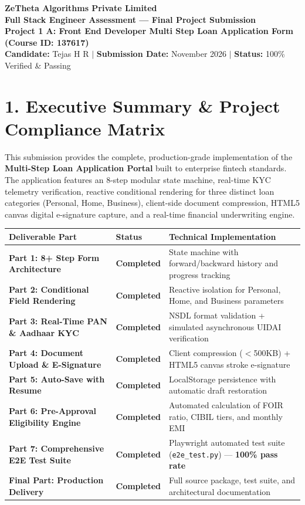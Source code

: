 \documentclass[11pt,a4paper]{article}
\begin{document}
\begin{center}
    {\LARGE \textbf{\color{primary}ZeTheta Algorithms Private Limited}}\\[4pt]
    {\large \textbf{Full Stack Engineer Assessment — Final Project Submission}}\\[2pt]
    \textbf{Project 1 A: Front End Developer Multi Step Loan Application Form (Course ID: 137617)}\\[3pt]
    \textbf{Candidate:} Tejas H R \quad $|$ \quad \textbf{Submission Date:} November 2026 \quad $|$ \quad \textbf{Status:} 100\% Verified \& Passing
\end{center}

\vspace{6pt}

\section{1. Executive Summary \& Project Compliance Matrix}
This submission provides the complete, production-grade implementation of the \textbf{Multi-Step Loan Application Portal} built to enterprise fintech standards. The application features an 8-step modular state machine, real-time KYC telemetry verification, reactive conditional rendering for three distinct loan categories (Personal, Home, Business), client-side document compression, HTML5 canvas digital e-signature capture, and a real-time financial underwriting engine.

\begin{table}[h]
\centering
\scriptsize
\begin{tabular}{@{}llp{8cm}@{}}
\toprule
\textbf{Deliverable Part} & \textbf{Status} & \textbf{Technical Implementation} \\ \midrule
\textbf{Part 1: 8+ Step Form Architecture} & \textbf{Completed} & State machine with forward/backward history and progress tracking \\
\textbf{Part 2: Conditional Field Rendering} & \textbf{Completed} & Reactive isolation for Personal, Home, and Business parameters \\
\textbf{Part 3: Real-Time PAN \& Aadhaar KYC} & \textbf{Completed} & NSDL format validation + simulated asynchronous UIDAI verification \\
\textbf{Part 4: Document Upload \& E-Signature} & \textbf{Completed} & Client compression ($<$500KB) + HTML5 canvas stroke e-signature \\
\textbf{Part 5: Auto-Save with Resume} & \textbf{Completed} & LocalStorage persistence with automatic draft restoration \\
\textbf{Part 6: Pre-Approval Eligibility Engine} & \textbf{Completed} & Automated calculation of FOIR ratio, CIBIL tiers, and monthly EMI \\
\textbf{Part 7: Comprehensive E2E Test Suite} & \textbf{Completed} & Playwright automated test suite (\texttt{e2e\_test.py}) — \textbf{100\% pass rate} \\
\textbf{Final Part: Production Delivery} & \textbf{Completed} & Full source package, test suite, and architectural documentation \\ \bottomrule
\end{tabular}
\end{table}
\end{document}
